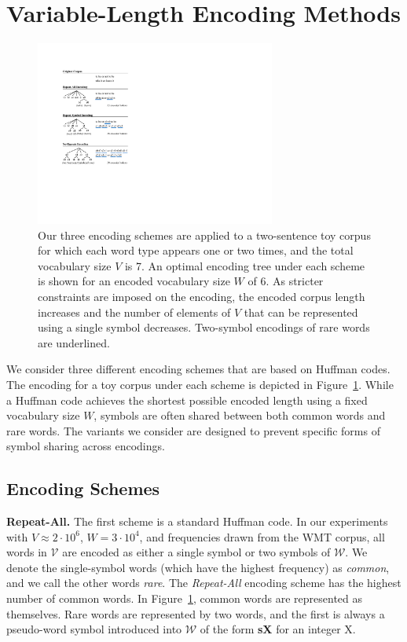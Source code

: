 \section{Variable-Length Encoding Methods}
\label{sec:encoding}

\begin{figure}[t]
\includegraphics[width=3.1in]{images/examples}
\caption{Our three encoding schemes are applied to a two-sentence toy corpus
for which each word type appears one or two times, and the total vocabulary
size $V$ is 7. An optimal encoding tree under each scheme is shown for an
encoded vocabulary size $W$ of 6. As stricter constraints are imposed on the
encoding, the encoded corpus length increases and the number of elements of $V$
that can be represented using a single symbol decreases. Two-symbol encodings
of rare words are underlined.}
\label{fig:examples}
\end{figure}

We consider three different encoding schemes that are based on Huffman codes.
The encoding for a toy corpus under each scheme is depicted in
Figure~\ref{fig:examples}. While a Huffman code achieves the shortest possible
encoded length using a fixed vocabulary size $W$, symbols are often shared
between both common words and rare words. The variants we
consider are designed to prevent specific forms of symbol sharing across encodings.

\subsection{Encoding Schemes}

\noindent\textbf{Repeat-All.}
The first scheme is a standard Huffman code. In our experiments with
$V\approx2\cdot10^6$, $W=3\cdot10^4$, and frequencies drawn from the WMT
corpus, all words in $\mathcal{V}$ are encoded as either a single symbol or two
symbols of $\mathcal{W}$. We denote the single-symbol words (which have the
highest frequency) as \emph{common}, and we call the other words \emph{rare}.
The \emph{Repeat-All} encoding scheme has the highest number of common words.
In Figure~\ref{fig:examples}, common words are represented as themselves. Rare
words are represented by two words, and the first is always a pseudo-word
symbol introduced into $\mathcal{W}$ of the form \textbf{sX} for an integer X.

